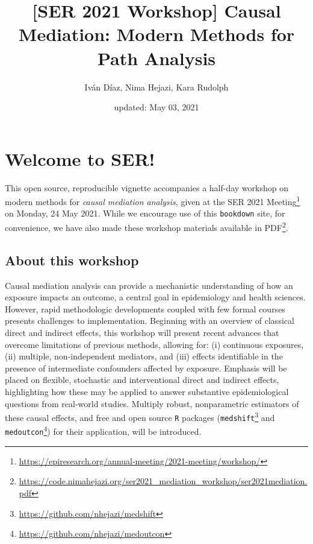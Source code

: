 \documentclass[
  12pt,
]{book}
\title{{[}SER 2021 Workshop{]} Causal Mediation: Modern Methods for Path Analysis}
\author{Iván Díaz, Nima Hejazi, Kara Rudolph}
\date{updated: May 03, 2021}
\newcommand{\passthrough}[1]{#1}
\renewcommand{\href}[2]{#2\footnote{\url{#1}}}
\theoremstyle{definition}
\theoremstyle{definition}
\theoremstyle{definition}
\newcommand{\1}{\mathbbm{1}}
\begin{document}
\maketitle


\thispagestyle{empty}

\begin{center}
\end{center}

\setlength{\abovedisplayskip}{-5pt}
\setlength{\abovedisplayshortskip}{-5pt}

\mainmatter

{
\hypersetup{linkcolor=}
\setcounter{tocdepth}{2}
\tableofcontents
}
\hypertarget{welcome-to-ser}{%
\chapter*{Welcome to SER!}\label{welcome-to-ser}}


This open source, reproducible vignette accompanies a half-day workshop on
modern methods for \emph{causal mediation analysis}, given at the \href{https://epiresearch.org/annual-meeting/2021-meeting/workshop/}{SER 2021
Meeting} on
Monday, 24 May 2021. While we encourage use of this \passthrough{\lstinline!bookdown!} site, for
convenience, we have also made these workshop materials \href{https://code.nimahejazi.org/ser2021_mediation_workshop/ser2021mediation.pdf}{available in
PDF}.

\hypertarget{about}{%
\section{About this workshop}\label{about}}

Causal mediation analysis can provide a mechanistic understanding of how an
exposure impacts an outcome, a central goal in epidemiology and health sciences.
However, rapid methodologic developments coupled with few formal courses
presents challenges to implementation. Beginning with an overview of classical
direct and indirect effects, this workshop will present recent advances that
overcome limitations of previous methods, allowing for: (i) continuous
exposures, (ii) multiple, non-independent mediators, and (iii) effects
identifiable in the presence of intermediate confounders affected by exposure.
Emphasis will be placed on flexible, stochastic and interventional direct and
indirect effects, highlighting how these may be applied to answer substantive
epidemiological questions from real-world studies. Multiply robust,
nonparametric estimators of these causal effects, and free and open source \passthrough{\lstinline!R!}
packages (\href{https://github.com/nhejazi/medshift}{\passthrough{\lstinline!medshift!}} and
\href{https://github.com/nhejazi/medoutcon}{\passthrough{\lstinline!medoutcon!}}) for their application, will
be introduced.
\end{document}
